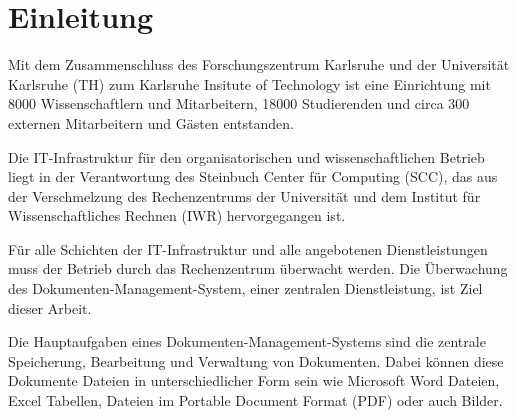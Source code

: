 \section{Einleitung}







Mit dem Zusammenschluss des Forschungszentrum Karlsruhe und der Universität Karlsruhe (TH) zum Karlsruhe Insitute of Technology ist eine Einrichtung mit 8000 Wissenschaftlern und Mitarbeitern, 18000 Studierenden und circa 300 externen Mitarbeitern und Gästen entstanden.


Die IT-Infrastruktur für den organisatorischen und wissenschaftlichen Betrieb liegt in der Verantwortung des Steinbuch Center für Computing (SCC), das aus der Verschmelzung des Rechenzentrums der Universität und dem Institut für Wissenschaftliches Rechnen (IWR) hervorgegangen ist.

Für alle Schichten der IT-Infrastruktur und alle angebotenen Dienstleistungen muss der Betrieb durch das Rechenzentrum überwacht werden.
Die Überwachung des Dokumenten-Management-System, einer zentralen Dienstleistung, ist Ziel dieser Arbeit.



Die Hauptaufgaben eines Dokumenten-Management-Systems sind die zentrale Speicherung, Bearbeitung und Verwaltung von Dokumenten.
Dabei können diese Dokumente Dateien in unterschiedlicher Form sein wie Microsoft Word Dateien, Excel Tabellen, Dateien im Portable Document Format (\gls{PDF}) oder auch Bilder.

